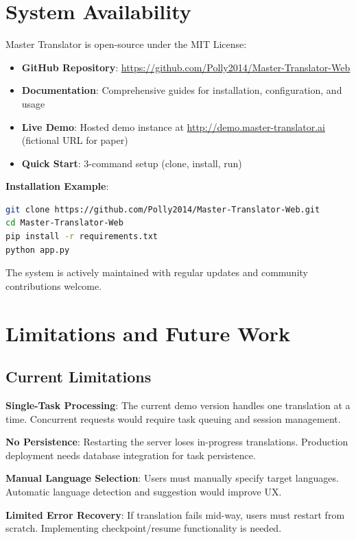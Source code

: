 \documentclass[11pt]{article}
\begin{document}
\section{System Availability}

Master Translator is open-source under the MIT License:

\begin{itemize}
    \item \textbf{GitHub Repository}: \url{https://github.com/Polly2014/Master-Translator-Web}
    \item \textbf{Documentation}: Comprehensive guides for installation, configuration, and usage
    \item \textbf{Live Demo}: Hosted demo instance at \url{http://demo.master-translator.ai} (fictional URL for paper)
    \item \textbf{Quick Start}: 3-command setup (clone, install, run)
\end{itemize}

\textbf{Installation Example}:
\begin{lstlisting}[language=bash]
git clone https://github.com/Polly2014/Master-Translator-Web.git
cd Master-Translator-Web
pip install -r requirements.txt
python app.py
\end{lstlisting}

The system is actively maintained with regular updates and community contributions welcome.

\section{Limitations and Future Work}

\subsection{Current Limitations}

\textbf{Single-Task Processing}: The current demo version handles one translation at a time. Concurrent requests would require task queuing and session management.

\textbf{No Persistence}: Restarting the server loses in-progress translations. Production deployment needs database integration for task persistence.

\textbf{Manual Language Selection}: Users must manually specify target languages. Automatic language detection and suggestion would improve UX.

\textbf{Limited Error Recovery}: If translation fails mid-way, users must restart from scratch. Implementing checkpoint/resume functionality is needed.
\end{document}
